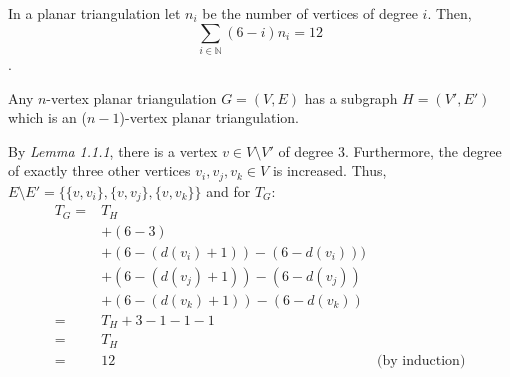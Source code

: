 \documentclass[a4paper]{article}
\begin{document}
\begin{solution}{17}
\begin{theorem}{In a planar triangulation let $n_i$ be the number of vertices of degree $i$. Then, \begin{equation*}\sum_{i \in \mathbb{N}} (6 - i)n_i = 12 \end{equation*}.}
\begin{itemize}
					Any $n$-vertex planar triangulation $G = (V, E)$ has a subgraph $H = (V', E')$ which is an  ($n - 1$)-vertex planar triangulation.
	
					By \emph{Lemma 1.1.1}, there is a vertex $v \in V \setminus V'$ of degree $3$. Furthermore, the degree of exactly three other vertices $v_i, v_j, v_k \in V$ is increased. Thus, $E \setminus E' = \{\{v, v_i\}, \{v, v_j\}, \{v, v_k\}\}$ and for $T_G$:
					\begin{align*}
						T_G=&T_H\\
						 &+ (6 - 3)\\
						 &+ (6 - (d(v_i) + 1)) - (6 - d(v_i)))\\
						 &+ (6 - (d(v_j) + 1)) - (6 - d(v_j))\\
						 &+ (6 - (d(v_k) + 1)) - (6 - d(v_k))\\
						=&T_H +  3 - 1 - 1 -1\\
						=&T_H\\
						=&12&\text{(by induction)}
					\end{align*}
			\end{itemize}
		\end{theorem}
	\end{solution}
	\newpage
\end{document}
